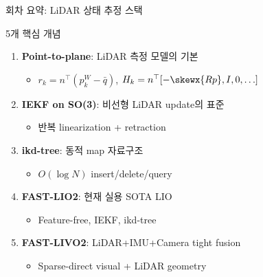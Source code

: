 \begin{frame}{회차 요약: LiDAR 상태 추정 스택}
  \begin{block}{5개 핵심 개념}
    \begin{enumerate}
      \item \textbf{Point-to-plane}: LiDAR 측정 모델의 기본
        \begin{itemize}
          \item $r_k = n^\top(p_k^W - \bar{q})$, $H_k = n^\top[-\skewx{Rp}, I, 0, \ldots]$
        \end{itemize}
      \item \textbf{IEKF on SO(3)}: 비선형 LiDAR update의 표준
        \begin{itemize}
          \item 반복 linearization + retraction
        \end{itemize}
      \item \textbf{ikd-tree}: 동적 map 자료구조
        \begin{itemize}
          \item $O(\log N)$ insert/delete/query
        \end{itemize}
      \item \textbf{FAST-LIO2}: 현재 실용 SOTA LIO
        \begin{itemize}
          \item Feature-free, IEKF, ikd-tree
        \end{itemize}
      \item \textbf{FAST-LIVO2}: LiDAR+IMU+Camera tight fusion
        \begin{itemize}
          \item Sparse-direct visual + LiDAR geometry
        \end{itemize}
    \end{enumerate}
  \end{block}
\end{frame}


